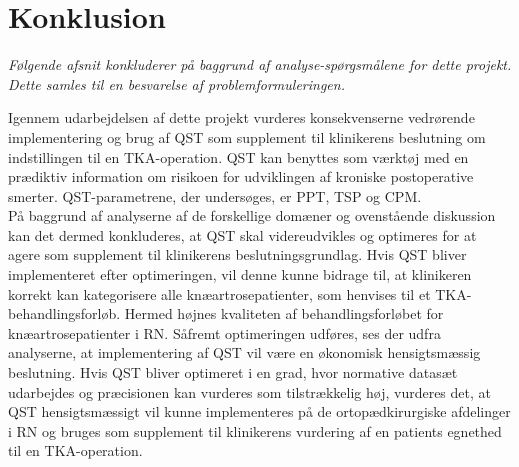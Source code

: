 \section{Konklusion}
\textit{Følgende afsnit konkluderer på baggrund af analyse-spørgsmålene for dette projekt. Dette samles til en besvarelse af problemformuleringen.}

Igennem udarbejdelsen af dette projekt vurderes konsekvenserne vedrørende implementering og brug af QST som supplement til klinikerens beslutning om indstillingen til en TKA-operation. QST kan benyttes som værktøj med en prædiktiv information om risikoen for udviklingen af kroniske postoperative smerter. QST-parametrene, der undersøges, er PPT, TSP og CPM.\\
På baggrund af analyserne af de forskellige domæner og ovenstående diskussion kan det dermed konkluderes, at QST skal videreudvikles og optimeres for at agere som supplement til klinikerens beslutningsgrundlag. Hvis QST bliver implementeret efter optimeringen, vil denne kunne bidrage til, at klinikeren korrekt kan kategorisere alle knæartrosepatienter, som henvises til et TKA-behandlingsforløb. Hermed højnes kvaliteten af behandlingsforløbet for knæartrosepatienter i RN. Såfremt optimeringen udføres, ses der udfra analyserne, at implementering af QST vil være en økonomisk hensigtsmæssig beslutning. Hvis QST bliver optimeret i en grad, hvor normative datasæt udarbejdes og præcisionen kan vurderes som tilstrækkelig høj, vurderes det, at QST hensigtsmæssigt vil kunne implementeres på de ortopædkirurgiske afdelinger i RN og bruges som supplement til klinikerens vurdering af en patients egnethed til en TKA-operation.

